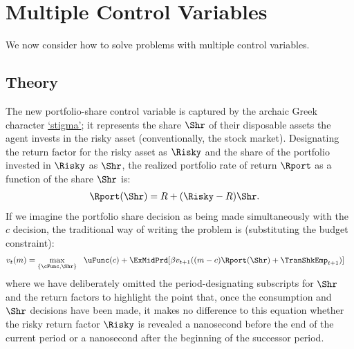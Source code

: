 \documentclass[titlepage, headings=optiontotocandhead]{Resources/texmf-local/tex/latex/econtex}
\begin{document}
\hypertarget{multiple-control-variables}{}
\section{Multiple Control Variables}\label{sec:multiple-control-variables}
We now consider how to solve problems with multiple control variables.  

\subsection{Theory}\label{subsec:MCTheory}

The new portfolio-share control variable is captured by the archaic Greek character \href{https://en.wikipedia.org/wiki/Stigma_(ligature)}{`stigma'}; it represents the share $\Shr$ of their disposable assets the agent invests in the risky asset (conventionally, the stock market).  Designating the return factor for the risky asset as $\Risky$ and the share of the portfolio invested in $\Risky$ as $\Shr$, the realized portfolio rate of return $\Rport$ as a function of the share $\Shr$ is:
\begin{equation}\begin{gathered}\begin{aligned}
      \Rport(\Shr) &= R+(\Risky-R)\Shr \label{eq:Shr}.
    \end{aligned}\end{gathered}\end{equation}
If we imagine the portfolio share decision as being made simultaneously with the $c$ decision, the traditional way of writing the problem is (substituting the budget constraint):
\begin{equation}\begin{gathered}\begin{aligned}
      v_{t}(m)  & = \max_{\{\cFunc,\Shr\}} ~~  \uFunc(c) + \ExMidPrd[\beta v_{t+1}((m-c)\Rport(\Shr) + {\TranShkEmp}_{t+1})] \label{eq:Bellmanundated}
    \end{aligned}\end{gathered}\end{equation}
where we have deliberately omitted the {period}-designating subscripts for $\Shr$ and the return factors to highlight the point that, once the consumption and $\Shr$ decisions have been made, it makes no difference to this equation whether the risky return factor $\Risky$ is revealed a nanosecond before the end of the current {period} or a nanosecond after the beginning of the successor {period}.
\end{document}
